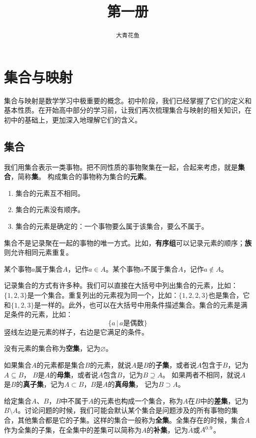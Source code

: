 \documentclass[12pt,UTF8]{ctexbook}
\title{\zihao{0} \bfseries 第一册}
\author{\zihao{2} \texttt{大青花鱼}}
\date{}
\begin{document}
\maketitle
\tableofcontents
\newpage

\chapter{集合与映射}

集合与映射是数学学习中极重要的概念。初中阶段，我们已经掌握了它们的定义和基本性质。在开始高中部分的学习前，让我们再次梳理集合与映射的相关知识，在初中的基础上，更加深入地理解它们的含义。

\section{集合}
我们用集合表示一类事物。把不同性质的事物聚集在一起，合起来考虑，就是\textbf{集合}，简称\textbf{集}。
构成集合的事物称为集合的\textbf{元素}。
\begin{enumerate}
    \item 集合的元素互不相同。
    \item 集合的元素没有顺序。
    \item 集合的元素是确定的：一个事物要么属于该集合，要么不属于。
\end{enumerate}

集合不是记录聚在一起的事物的唯一方式。比如，\textbf{有序组}可以记录元素的顺序；\textbf{族}则允许相同元素重复。

某个事物$a$属于集合$A$，记作$a\in A$。某个事物$a$不属于集合$A$，记作$a\notin A$。

记录集合的方式有许多种。我们可以直接在大括号中列出集合的元素，比如：$\{1,2,3\}$是一个集合。重复列出的元素视为同一个，比如：$\{1,2,2,3\}$也是集合，它和$\{1,2,3\}$是一样的。此外，也可以在大括号中用条件描述集合。集合的元素是满足条件的元素，比如：
$$\{ a\, |\, a\mbox{是偶数}\}$$
竖线左边是元素的样子，右边是它满足的条件。

没有元素的集合称为\textbf{空集}，记为$\varnothing$。

如果集合$A$的元素都是集合$B$的元素，就说$A$是$B$的\textbf{子集}，或者说$A$包含于$B$，记为$A\subseteq B$，
$B$是$A$的\textbf{母集}，或者说$A$包含$B$，记为$B\supseteq A$。
如果两者不相同，就说$A$是$B$的\textbf{真子集}，记为$A\subset B$，$B$是$A$的\textbf{真母集}，
记为$B\supset A$。

给定集合$A$、$B$，$B$中不属于$A$的元素也构成一个集合，称为$A$在$B$中的\textbf{差集}，记为$B\setminus A$。讨论问题的时候，我们可能会默认某个集合是问题涉及的所有事物的集合，其他集合都是它的子集。这样的集合一般称为\textbf{全集}。全集存在的时候，集合$A$作为全集的子集，在全集中的差集可以简称为$A$的\textbf{补集}，记为$\bar{A}$或$A^{0.9}$。
\end{document}
